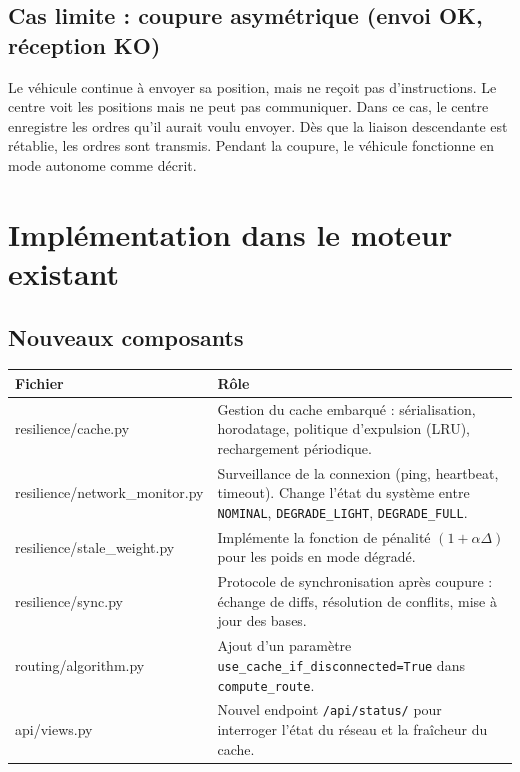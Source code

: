 \documentclass[12pt,a4paper]{article}
\theoremstyle{definition}
\theoremstyle{remark}
\begin{document}
\subsection{Cas limite : coupure asymétrique (envoi OK, réception KO)}

Le véhicule continue à envoyer sa position, mais ne reçoit pas
d’instructions. Le centre voit les positions mais ne peut pas
communiquer. Dans ce cas, le centre enregistre les ordres qu’il
aurait voulu envoyer. Dès que la liaison descendante est rétablie,
les ordres sont transmis. Pendant la coupure, le véhicule fonctionne
en mode autonome comme décrit.

\newpage

\section{Implémentation dans le moteur existant}

\subsection{Nouveaux composants}

\begin{center}
\begin{tabular}{>{\ttfamily}p{4cm} p{9cm}}
  \toprule
  \textbf{Fichier} & \textbf{Rôle} \\
  \midrule
  resilience/cache.py &
    Gestion du cache embarqué : sérialisation, horodatage, politique
    d’expulsion (LRU), rechargement périodique. \\[0.4em]
  resilience/network\_monitor.py &
    Surveillance de la connexion (ping, heartbeat, timeout).
    Change l’état du système entre \texttt{NOMINAL}, \texttt{DEGRADE\_LIGHT},
    \texttt{DEGRADE\_FULL}. \\[0.4em]
  resilience/stale\_weight.py &
    Implémente la fonction de pénalité $(1 + \alpha \Delta)$ pour
    les poids en mode dégradé. \\[0.4em]
  resilience/sync.py &
    Protocole de synchronisation après coupure : échange de diffs,
    résolution de conflits, mise à jour des bases. \\[0.4em]
  routing/algorithm.py &
    Ajout d’un paramètre \texttt{use\_cache\_if\_disconnected=True}
    dans \texttt{compute\_route}. \\[0.4em]
  api/views.py &
    Nouvel endpoint \texttt{/api/status/} pour interroger l’état
    du réseau et la fraîcheur du cache. \\
  \bottomrule
\end{tabular}
\end{center}
\end{document}
